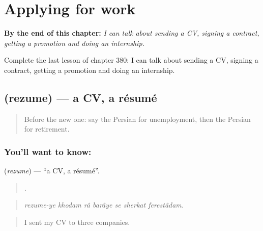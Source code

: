 
\chapter{Applying for work}
\label{ch:fa-applying-for-work}

\begin{chapteropening}
\textbf{By the end of this chapter:} \emph{I can talk about sending a CV, signing a contract, getting a promotion and doing an internship.}

Complete the last lesson of chapter 380: I can talk about sending a CV, signing a contract, getting a promotion and doing an internship.
\end{chapteropening}

\section[\texorpdfstring{\fa{رزومه} (rezume)}{رزومه (rezume)}]{ (rezume) — a CV, a résumé}

\label{lesson:FA-C380-rezume}



\begin{quote}
Before the new one: say the Persian for unemployment, then the Persian for retirement.
\end{quote}

\subsection*{You'll want to know: }
\textbf{} (\emph{rezume}) — \textquotedblleft{}a CV, a résumé\textquotedblright{}.

\begin{quote}
      .
\end{quote}

\begin{quote}
\emph{rezume-ye khodam râ barâye se sherkat ferestâdam.}
\end{quote}

\begin{quote}
I sent my CV to three companies.
\end{quote}

